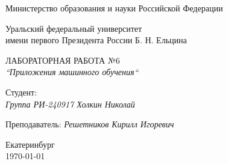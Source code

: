 \thispagestyle{empty}

\begin{center}
	Министерство образования и науки Российской Федерации
	
	\vspace{20pt}
	
	Уральский федеральный университет \\
	имени первого Президента России Б. Н. Ельцина
	
	\vspace{20pt}

\end{center}

\vfill

\begin{center}
	ЛАБОРАТОРНАЯ РАБОТА №6 \\
	\textit{``Приложения машинного обучения``}
	
	\vspace{20pt}
\end{center}

\vfill

	\noindent Студент: \\
	\textit{Группа РИ-240917 \hfill Холкин Николай}
	
	\vspace{5pt}
	
	\noindent Преподаватель: 
	\textit{\hfill Решетников Кирилл Игоревич}
	
	\vspace{20pt}

\vfill

\begin{center}
	Екатеринбург \\ \today
\end{center}

\newpage